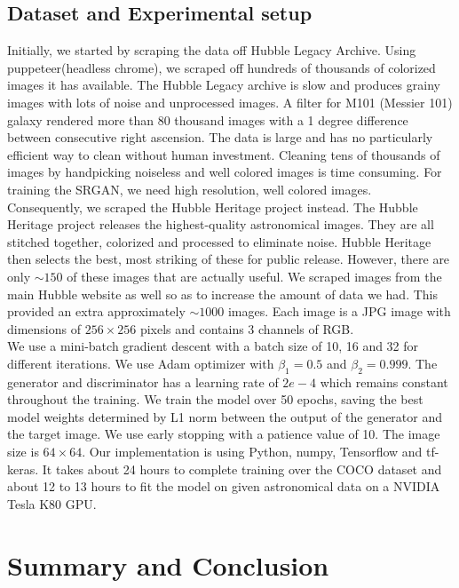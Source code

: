 \documentclass[oneside,a4paper,12pt]{report}
\begin{document}
\section{Dataset and Experimental setup}
\hspace*{0.25 in}Initially, we started by scraping the data off Hubble Legacy Archive. Using puppeteer(headless chrome), we scraped off hundreds of thousands of colorized images it has available. The Hubble Legacy archive is slow and produces grainy images with lots of noise and unprocessed images. A filter for M101 (Messier 101) galaxy rendered more than 80 thousand images with a 1 degree difference between consecutive right ascension. The data is large and has no particularly efficient way to clean without human investment. Cleaning tens of thousands of images by handpicking noiseless and well colored images is time consuming. For training the SRGAN, we need high resolution, well colored images. \\
\hspace*{0.25 in}Consequently, we scraped the Hubble Heritage project instead. The Hubble Heritage project releases the highest-quality astronomical images. They are all stitched together, colorized and processed to eliminate noise. Hubble Heritage then selects the best, most striking of these for public release. However, there are only $\sim150$ of these images that are actually useful. We scraped images from the main Hubble website as well so as to increase the amount of data we had. This provided an extra approximately $\sim1000$ images.
Each image is a JPG image with dimensions of $256\times 256$ pixels and contains 3 channels of RGB.\\
\hspace*{0.25 in}We use a mini-batch gradient descent with a batch size of 10, 16 and 32 for different iterations. We use Adam optimizer with $\beta_1 = 0.5$ and $\beta_2 = 0.999$. The generator and discriminator has a learning rate of $2e-4$ which remains constant throughout the training. We train the model over 50 epochs, saving the best model weights determined by L1 norm between the output of the generator and the target image. We use early stopping with a patience value of 10. The image size is $64\times64$. Our implementation is using Python, numpy, Tensorflow and tf-keras. It takes about 24 hours to complete training over the COCO dataset and about 12 to 13 hours to fit the model on given astronomical data on a NVIDIA Tesla K80 GPU.


\chapter{Summary and Conclusion}
\end{document}
